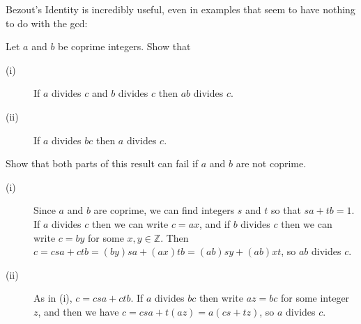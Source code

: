 \documentclass[11pt,dvipsnames]{book}
\def\Z{\mathbb{Z}}
\numberwithin{equation}{section} %
\numberwithin{figure}{section} %
\numberwithin{table}{section} %
\begin{document}
Bezout's Identity is incredibly useful, even in examples that seem to have nothing to do with the gcd:

\begin{exercise}
Let $a$ and $b$ be coprime integers. Show that
\begin{description}
\item[(i)] If  $a$ divides $c$ and $b$ divides $c$ then $ab$ divides $c$.
\item[(ii)] If $a$ divides $bc$ then $a$ divides $c$.
\end{description}
Show that both parts of this result can fail if $a$ and $b$ are not coprime.
\end{exercise}

\begin{solution}
\begin{description}
\item[(i)] Since $a$ and $b$ are coprime, we can find integers $s$ and $t$ so that $sa + tb = 1$. If $a$ divides $c$ then we can write $c = ax$, and if $b$ divides $c$ then we can write $c = by$ for some $x,y \in \Z$. Then $c = csa + ctb = (by)sa + (ax)tb = (ab)sy + (ab)xt$, so $ab $ divides $ c$.
\item[(ii)] As in (i), $c = csa + ctb$. If $a $ divides $bc$ then write $az = bc$ for some integer $z$, and then we have $c = csa + t(az) = a(cs + tz)$, so $a$ divides $c$.
\end{description}
\end{solution}
\end{document}

